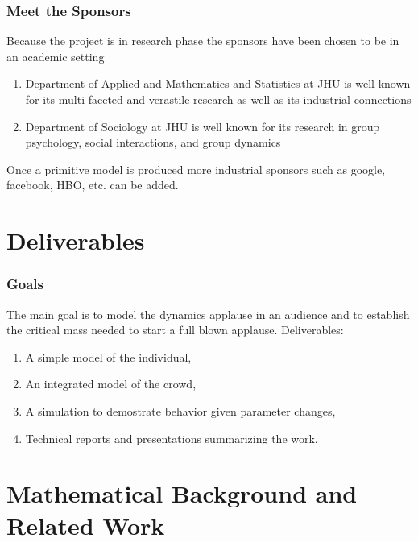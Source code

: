 \documentclass[compress,handout,10pt]{beamer}
\let\olditem\item
\renewcommand{\item}{\setlength{\itemsep}{0.5\baselineskip}\olditem}
\begin{document}
\begin{frame}
  \frametitle{Meet the Sponsors}
   Because the project is in research phase the sponsors have been chosen to be in an academic setting
	\begin{enumerate}
		\item Department of Applied and Mathematics and Statistics at JHU\newline \newline
	is well known for its multi-faceted and verastile research as well as its industrial connections		
		\item Department of Sociology at JHU\newline \newline
	is well known for its research in group psychology, social interactions, and group dynamics
	\end{enumerate} 
\vspace{7pt}

Once a primitive model is produced more industrial sponsors such as google, facebook, HBO, etc. can be added.

\end{frame}

\section{Deliverables}

\begin{frame}
   \frametitle{Goals}
   The main goal is to model the dynamics applause in an audience and to establish the critical mass needed to start a full blown applause.\newline\newline
 Deliverables:
 \vspace{7pt}
	\begin{enumerate}
		\item A simple model of the individual,
		\item An integrated model of the crowd,
		\item A simulation to demostrate behavior given parameter changes,
		\item Technical reports and presentations summarizing the work.
	\end{enumerate}



\end{frame}


\section {Mathematical Background and Related Work}
\end{document}
